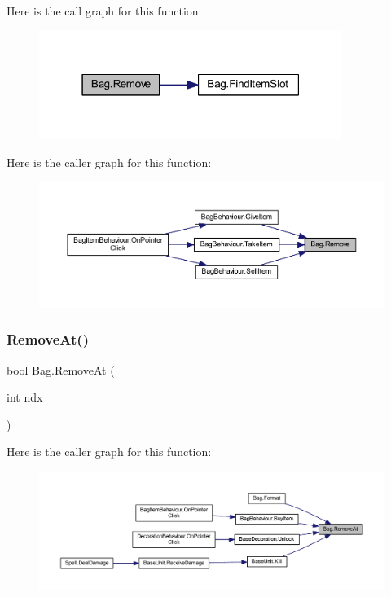 Here is the call graph for this function\+:
\nopagebreak
\begin{figure}[H]
\begin{center}
\leavevmode
\includegraphics[width=279pt]{class_bag_a42a4319aa14d0b6bda7f91070ba57a47_cgraph}
\end{center}
\end{figure}
Here is the caller graph for this function\+:
\nopagebreak
\begin{figure}[H]
\begin{center}
\leavevmode
\includegraphics[width=350pt]{class_bag_a42a4319aa14d0b6bda7f91070ba57a47_icgraph}
\end{center}
\end{figure}
\mbox{\label{class_bag_a2f11a414bf3edfd7f380f30b71f34104}} 
\subsubsection{\texorpdfstring{RemoveAt()}{RemoveAt()}}
{\footnotesize\ttfamily bool Bag.\+Remove\+At (\begin{DoxyParamCaption}\item[{int}]{ndx }\end{DoxyParamCaption})}

Here is the caller graph for this function\+:
\nopagebreak
\begin{figure}[H]
\begin{center}
\leavevmode
\includegraphics[width=350pt]{class_bag_a2f11a414bf3edfd7f380f30b71f34104_icgraph}
\end{center}
\end{figure}
\mbox{\label{class_bag_aacb4579a06f66e1578327635e2120b3e}} 
